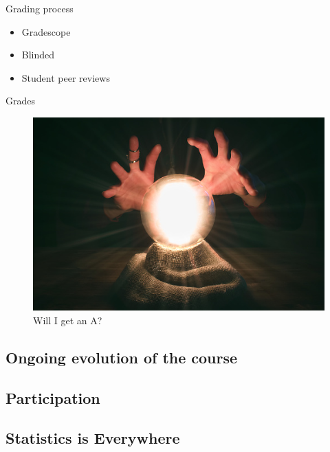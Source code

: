 \documentclass[ignorenonframetext,aspectratio=169]{beamer}
\providecommand{\tightlist}{%
  \setlength{\itemsep}{0pt}\setlength{\parskip}{0pt}}
\begin{document}
\begin{frame}{Grading process}

\begin{itemize}
\tightlist
\item
  Gradescope
\item
  Blinded
\item
  Student peer reviews
\end{itemize}

\end{frame}

\begin{frame}{Grades}

\begin{figure}
\centering
\includegraphics{crystalball.jpg}
\caption{Will I get an A?}
\end{figure}

\end{frame}

\subsection{Ongoing evolution of the
course}\label{ongoing-evolution-of-the-course}

\subsection{Participation}\label{participation}

\subsection{Statistics is Everywhere}\label{statistics-is-everywhere}
\end{document}
